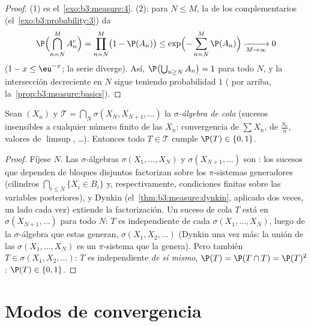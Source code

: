 \begin{proof}
(1) es el~\cref{exo:b3:measure:4}. (2): para $N \leq M$, la
 de los
complementarios (el~\cref{exo:b3:probability:3}) da
\[
\P\Bigl(\bigcap_{n=N}^{M}A_n^c\Bigr) = \prod_{n=N}^M\bigl(1
- \P(A_n)\bigr) \leq
\exp\Bigl(-\sum_{n=N}^M\P(A_n)\Bigr) \xrightarrow[M \to
\infty]{} 0
\]
($1 - x \leq \eu^{-x}$; la serie diverge). Así,
$\P\bigl(\bigcup_{n\geq N}A_n\bigr) = 1$ para todo $N$, y la
intersección decreciente en $N$ sigue teniendo probabilidad $1$
( por arriba,
la~\cref{prop:b3:measure:basics}).
\end{proof}

\begin{theorem}
\label{thm:b3:probability:zeroone}
Sean $(X_n)$  y
$\mathcal T =
\bigcap_N\sigma(X_N, X_{N+1}, \dots)$ la \emph{$\sigma$-álgebra de
cola} (sucesos insensibles a cualquier
número finito de las $X_n$: convergencia de $\sum X_n$, de
$\frac{S_n}n$, valores de $\limsup$, \dots). Entonces todo
$T \in \mathcal T$ cumple $\P(T) \in \{0,
1\}$.
\end{theorem}

\begin{proof}
Fíjese $N$. Las $\sigma$-álgebras $\sigma(X_1, \dots, X_N)$ y
$\sigma(X_{N+1}, \dots)$ son
: los sucesos
que dependen de bloques disjuntos factorizan sobre los $\pi$-sistemas
generadores (cilindros $\bigcap_{i\leq N}\{X_i \in B_i\}$ y,
respectivamente, condiciones finitas sobre las variables posteriores), y
Dynkin (el~\cref{thm:b3:measure:dynkin}, aplicado dos veces, un lado
cada vez) extiende la factorización. Un suceso de cola $T$ está en
$\sigma(X_{N+1}, \dots)$ para todo $N$: $T$ es
independiente de cada
$\sigma(X_1, \dots, X_N)$, luego de la $\sigma$-álgebra que estas
generan, $\sigma(X_1, X_2, \dots)$ (Dynkin una vez más: la unión de las
$\sigma(X_1,\dots,X_N)$ es un $\pi$-sistema que la genera). Pero también
$T \in \sigma(X_1, X_2, \dots)$: $T$ es
independiente \emph{de sí
mismo}, $\P(T) = \P(T\cap T) =
\P(T)^2$: $\P(T) \in \{0, 1\}$.
\end{proof}

\section{Modos de convergencia}

